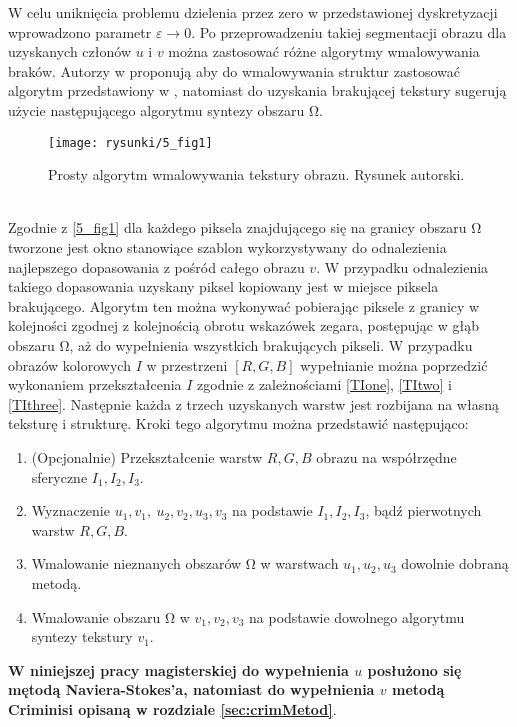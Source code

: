 \documentclass[a4paper,12pt,twoside,openany]{report}
\begin{document}
W celu uniknięcia problemu dzielenia przez zero w przedstawionej dyskretyzacji wprowadzono parametr $\varepsilon \rightarrow 0$. 
Po przeprowadzeniu takiej segmentacji obrazu dla uzyskanych członów $u$ i $v$ można zastosować różne algorytmy wmalowywania braków. Autorzy w \cite{NavierStokesAndTexturePropagation} proponują aby do wmalowywania struktur zastosować algorytm przedstawiony w \cite{bertalmio2000image}, natomiast do uzyskania brakującej tekstury sugerują użycie następującego algorytmu syntezy obszaru $\mathrm{\Omega }$.
\begin{figure}[!h]
	\centering
	\texttt{[image: rysunki/5\_fig1]}
	\caption{Prosty algorytm wmalowywania tekstury obrazu. Rysunek autorski.}
	\label{5_fig1}
\end{figure} \\
Zgodnie z \autoref{5_fig1} dla każdego piksela znajdującego się na granicy obszaru $\mathrm{\Omega }$ tworzone jest okno stanowiące szablon wykorzystywany do odnalezienia najlepszego dopasowania z pośród całego obrazu $v$. W przypadku odnalezienia takiego dopasowania uzyskany piksel kopiowany jest w miejsce piksela brakującego. Algorytm ten można wykonywać pobierając piksele z granicy w kolejności zgodnej z kolejnością obrotu wskazówek zegara, postępując w głąb obszaru $\mathrm{\Omega }$, aż do wypełnienia wszystkich brakujących pikseli. 
W przypadku obrazów kolorowych $I$ w przestrzeni $[R, G, B]$ wypełnianie można poprzedzić wykonaniem przekształcenia $I$ zgodnie z zależnościami \eqref{TIone}, \eqref{TItwo} i \eqref{TIthree}. Następnie każda z trzech uzyskanych warstw jest rozbijana na własną teksturę i strukturę. Kroki tego  algorytmu można przedstawić następująco:
\begin{enumerate}
\item
(Opcjonalnie) Przekształcenie warstw $R,G,B$ obrazu na współrzędne sferyczne $I_1,I_2,I_3$.
\item
Wyznaczenie $u_1,v_1,\ u_2,v_2,u_3,v_3$ na podstawie $I_1, I_2, I_3$, bądź pierwotnych warstw $R, G, B$.
\item
Wmalowanie nieznanych obszarów $\mathrm{\Omega }$ w warstwach $u_1,u_2,u_3$ dowolnie dobraną metodą.
\item
Wmalowanie obszaru $\mathrm{\Omega }$ w $v_1,v_2,v_3$ na podstawie dowolnego algorytmu syntezy tekstury $v_1$.
\end{enumerate}
\textbf{W niniejszej pracy magisterskiej do wypełnienia $u$ posłużono się mętodą Naviera-Stokes'a, natomiast do wypełnienia $v$ metodą Criminisi opisaną w rozdziale \ref{sec:crimMetod}}.
\end{document}
